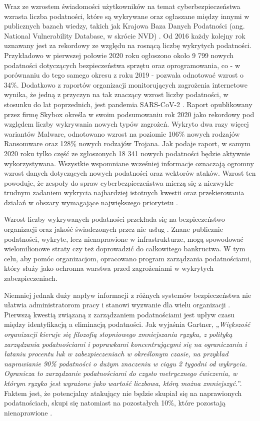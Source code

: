 Wraz ze wzrostem świadomości użytkowników na temat cyberbezpieczeństwa wzrasta liczba podatności, które są wykrywane oraz ogłaszane między innymi w publicznych bazach wiedzy, takich jak Krajowa Baza Danych Podatności (ang. National Vulnerability Database, w skrócie NVD) \cite{booth2013national}. Od 2016 każdy kolejny rok uznawany jest za rekordowy ze względu na rosnącą liczbę wykrytych podatności. Przykładowo w pierwszej połowie 2020 roku ogłoszono około 9 799 nowych podatności dotyczących bezpieczeństwa sprzętu oraz oprogramowania, co - w porównaniu do tego samego okresu z roku 2019 - pozwala odnotować wzrost o 34\%. Dodatkowo z raportów organizacji monitorujących zagrożenia internetowe wynika, że jedną z przyczyn na tak znaczący wzrost liczby podatności, w stosunku do lat poprzednich, jest pandemia SARS-CoV-2 \cite{SkyboxR-2020}. Raport opublikowany przez firmę Skybox określa w swoim podsumowaniu rok 2020 jako rekordowy pod względem liczby wykrywania nowych typów zagrożeń. Wykryto dwa razy więcej wariantów Malware, odnotowano wzrost na poziomie 106\%  nowych rodzajów Ransomware oraz 128\% nowych rodzajów Trojana. Jak podaje raport, w samym 2020 roku tylko część ze zgłoszonych 18 341 nowych podatności będzie aktywnie wykorzystywana. Wszystkie wspomniane wcześniej informacje oznaczają ogromny wzrost danych dotyczących nowych podatności oraz wektorów ataków. Wzrost ten powoduje, że zespoły do spraw cyberbezpieczeństwa mierzą się z niezwykle trudnym zadaniem wykrycia najbardziej istotnych kwestii oraz przekierowania działań w obszary wymagające największego priorytetu \cite{SkyboxR-2021}.

\bigbreak
Wzrost liczby wykrywanych podatności przekłada się na bezpieczeństwo organizacji oraz jakość świadczonych przez nie usług \cite{walkowski2018impact}. Znane publicznie podatności, wykryte, lecz nienaprawione w infrastrukturze, mogą spowodować wielomilionowe straty czy też doprowadzić do całkowitego bankructwa. W tym celu, aby pomóc organizacjom, opracowano program zarządzania podatnościami, który służy jako ochronna warstwa przed zagrożeniami w wykrytych zabezpieczeniach.

\bigbreak
Niemniej jednak duży napływ informacji z różnych systemów bezpieczeństwa nie ułatwia administratorom pracy i stanowi wyzwanie dla wielu organizacji \cite{Gartner-2020}. Pierwszą kwestią związaną z zarządzaniem podatnościami jest upływ czasu między identyfikacją a eliminacją podatności. Jak wyjaśnia Gartner, „\emph{Większość organizacji kieruje się filozofią stopniowego zmniejszania ryzyka, z polityką zarządzania podatnościami i poprawkami koncentrującymi się na ograniczaniu i łataniu procentu luk w zabezpieczeniach w określonym czasie, na przykład naprawianie 90\% podatności o dużym znaczeniu w ciągu 2 tygodni od wykrycia. Ogranicza to zarządzanie podatnościami do czysto metrycznego ćwiczenia, w którym ryzyko jest wyrażone jako wartość liczbowa, którą można zmniejszyć.}”. Faktem jest, że potencjalny atakujący nie będzie skupiał się na naprawionych podatnościach, skupi się natomiast na pozostałych 10\%, które pozostają nienaprawione \cite{rochford2008t}.

